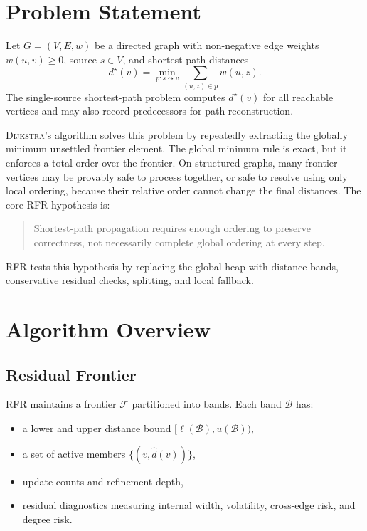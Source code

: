 \documentclass[11pt]{article}
\newcommand{\RFR}{\textsc{RFR}}
\newcommand{\Dijkstra}{\textsc{Dijkstra}}
\newcommand{\frontier}{\mathcal{F}}
\newcommand{\band}{\mathcal{B}}
\newcommand{\vertices}{V}
\newcommand{\edges}{E}
\begin{document}
\section{Problem Statement}
\label{sec:problem}

Let $G=(\vertices,\edges,w)$ be a directed graph with non-negative edge weights $w(u,v)\ge 0$, source $s\in \vertices$, and shortest-path distances
\[
  d^\star(v)=\min_{p:s\leadsto v}\sum_{(u,z)\in p} w(u,z).
\]
The single-source shortest-path problem computes $d^\star(v)$ for all reachable vertices and may also record predecessors for path reconstruction.

\Dijkstra{}'s algorithm solves this problem by repeatedly extracting the globally minimum unsettled frontier element. The global minimum rule is exact, but it enforces a total order over the frontier. On structured graphs, many frontier vertices may be provably safe to process together, or safe to resolve using only local ordering, because their relative order cannot change the final distances. The core \RFR{} hypothesis is:

\begin{quote}
Shortest-path propagation requires enough ordering to preserve correctness, not necessarily complete global ordering at every step.
\end{quote}

\RFR{} tests this hypothesis by replacing the global heap with distance bands, conservative residual checks, splitting, and local fallback.

\section{Algorithm Overview}
\label{sec:algorithm}

\subsection{Residual Frontier}

\RFR{} maintains a frontier $\frontier$ partitioned into bands. Each band $\band$ has:

\begin{itemize}
  \item a lower and upper distance bound $[\ell(\band), u(\band))$,
  \item a set of active members $\{(v, \hat d(v))\}$,
  \item update counts and refinement depth,
  \item residual diagnostics measuring internal width, volatility, cross-edge risk, and degree risk.
\end{itemize}
\end{document}
